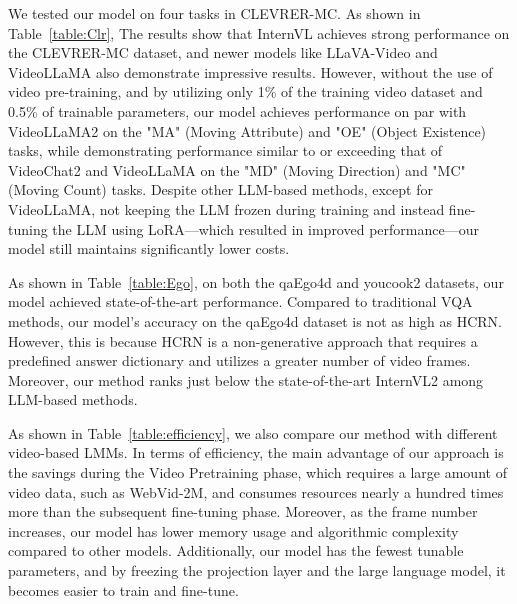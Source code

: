 We tested our model on four tasks in CLEVRER-MC. As shown in Table~\ref{table:Clr}, The results show that InternVL achieves strong performance on the CLEVRER-MC dataset, and newer models like LLaVA-Video and VideoLLaMA also demonstrate impressive results. However, without the use of video pre-training, and by utilizing only 1\% of the training video dataset and 0.5\% of trainable parameters, our model achieves performance on par with VideoLLaMA2 on the "MA" (Moving Attribute) and "OE" (Object Existence) tasks, while demonstrating performance similar to or exceeding that of VideoChat2 and VideoLLaMA on the "MD" (Moving Direction) and "MC" (Moving Count) tasks. Despite other LLM-based methods, except for VideoLLaMA, not keeping the LLM frozen during training and instead fine-tuning the LLM using LoRA—which resulted in improved performance—our model still maintains significantly lower costs.

As shown in Table~\ref{table:Ego}, on both the qaEgo4d and youcook2 datasets, our model achieved state-of-the-art performance. Compared to traditional VQA methods, our model's accuracy on the qaEgo4d dataset is not as high as HCRN. However, this is because HCRN is a non-generative approach that requires a predefined answer dictionary and utilizes a greater number of video frames. Moreover, our method ranks just below the state-of-the-art InternVL2 among LLM-based methods.

As shown in Table~\ref{table:efficiency}, we also compare our method with different video-based LMMs. In terms of efficiency, the main advantage of our approach is the savings during the Video Pretraining phase, which requires a large amount of video data, such as WebVid-2M, and consumes resources nearly a hundred times more than the subsequent fine-tuning phase. Moreover, as the frame number increases, our model has lower memory usage and algorithmic complexity compared to other models. Additionally, our model has the fewest tunable parameters, and by freezing the projection layer and the large language model, it becomes easier to train and fine-tune.

